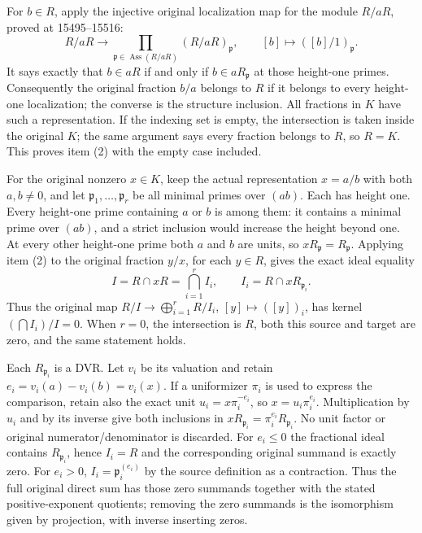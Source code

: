 For \(b\in R\), apply the injective original localization map for the module \(R/aR\), proved at 15495--15516: \[
 R/aR\longrightarrow\prod_{\mathfrak p\in\operatorname{Ass}(R/aR)}(R/aR)_{\mathfrak p},
 \qquad [b]\longmapsto([b]/1)_{\mathfrak p}.
\] It says exactly that \(b\in aR\) if and only if \(b\in aR_{\mathfrak p}\) at those height-one primes. Consequently the original fraction \(b/a\) belongs to \(R\) if it belongs to every height-one localization; the converse is the structure inclusion. All fractions in \(K\) have such a representation. If the indexing set is empty, the intersection is taken inside the original \(K\); the same argument says every fraction belongs to \(R\), so \(R=K\). This proves item (2) with the empty case included.

For the original nonzero \(x\in K\), keep the actual representation \(x=a/b\) with both \(a,b\ne0\), and let \(\mathfrak p_1,\ldots,\mathfrak p_r\) be all minimal primes over \((ab)\). Each has height one. Every height-one prime containing \(a\) or \(b\) is among them: it contains a minimal prime over \((ab)\), and a strict inclusion would increase the height beyond one. At every other height-one prime both \(a\) and \(b\) are units, so \(xR_{\mathfrak p}=R_{\mathfrak p}\). Applying item (2) to the original fraction \(y/x\), for each \(y\in R\), gives the exact ideal equality \[
 I=R\cap xR=\bigcap_{i=1}^r I_i,\qquad I_i=R\cap xR_{\mathfrak p_i}.
\] Thus the original map \(R/I\to\bigoplus_{i=1}^rR/I_i\), \([y]\mapsto([y])_i\), has kernel \((\bigcap I_i)/I=0\). When \(r=0\), the intersection is \(R\), both this source and target are zero, and the same statement holds.

Each \(R_{\mathfrak p_i}\) is a DVR. Let \(v_i\) be its valuation and retain \(e_i=v_i(a)-v_i(b)=v_i(x)\). If a uniformizer \(\pi_i\) is used to express the comparison, retain also the exact unit \(u_i=x\pi_i^{-e_i}\), so \(x=u_i\pi_i^{e_i}\). Multiplication by \(u_i\) and by its inverse give both inclusions in \(xR_{\mathfrak p_i}=\pi_i^{e_i}R_{\mathfrak p_i}\). No unit factor or original numerator/denominator is discarded. For \(e_i\leq0\) the fractional ideal contains \(R_{\mathfrak p_i}\), hence \(I_i=R\) and the corresponding original summand is exactly zero. For \(e_i>0\), \(I_i=\mathfrak p_i^{(e_i)}\) by the source definition as a contraction. Thus the full original direct sum has those zero summands together with the stated positive-exponent quotients; removing the zero summands is the isomorphism given by projection, with inverse inserting zeros.

